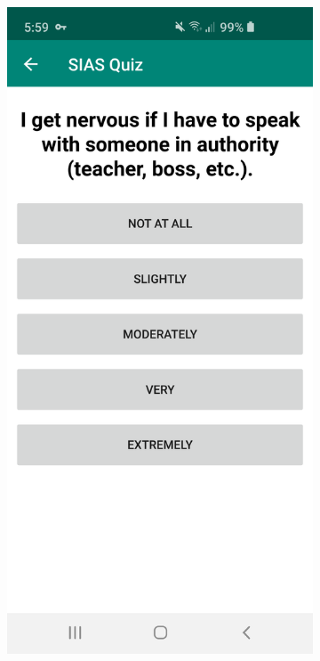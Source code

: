 \documentclass{l4proj}
\begin{document}
\begin{figure}[htbp]
    \centering
    \begin{subfigure}[b]{0.30\textwidth}
        \includegraphics[width=\textwidth]{images/sias.pdf}

\end{subfigure}
\end{figure}
\end{document}
